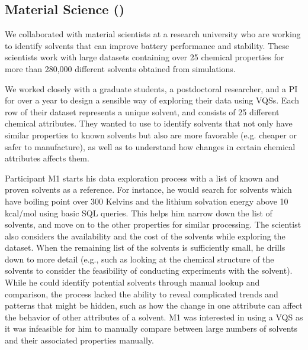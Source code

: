 \subsection{Material Science (\matsci)}
\par We collaborated with material scientists at a research university who are working to identify solvents that can improve battery performance and stability. These scientists work with large datasets containing over 25 chemical properties for more than 280,000 different solvents obtained from simulations. 
\par We worked closely with a graduate students, a postdoctoral researcher, and a PI for over a year to design a sensible way of exploring their data using VQSs. Each row of their dataset represents a unique solvent, and consists of 25 different chemical attributes. They wanted to use \zv to identify solvents that not only have similar properties to known solvents but also are more favorable (e.g. cheaper or safer to manufacture), as well as to understand how changes in certain chemical attributes affects them.
\par Participant M1 starts his data exploration process with a list of known and proven solvents as a reference. For instance, he would search for solvents which have boiling point over 300 Kelvins and the lithium solvation energy above 10 kcal/mol using basic SQL queries. This helps him narrow down the list of solvents, and move on to the other properties for similar processing. The scientist also considers the availability and the cost of the solvents while exploring the dataset. When the remaining list of the solvents is sufficiently small, he drills down to more detail (e.g., such as looking at the chemical structure of the solvents to consider the feasibility of conducting experiments with the solvent). While he could identify potential solvents through  manual lookup and comparison,  the process lacked the ability to reveal complicated trends and patterns that might be hidden, such as how the change in one attribute can affect the behavior of other attributes of a solvent. M1 was interested in using a VQS as it was infeasible for him to manually compare between large numbers of solvents and their associated properties manually.


